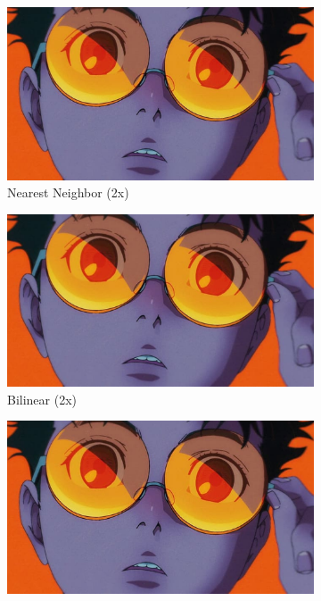 \documentclass[12pt,a4paper]{article}
\begin{document}
\begin{figure}[H]
  \centering
  \begin{subfigure}[b]{0.45\textwidth}
    \includegraphics[width=\textwidth]{interpolation/interpolation_nearest_2x.jpg}
    \caption{Nearest Neighbor (2x)}
  \end{subfigure}
  \hfill
  \begin{subfigure}[b]{0.45\textwidth}
    \includegraphics[width=\textwidth]{interpolation/interpolation_bilinear_2x.jpg}
    \caption{Bilinear (2x)}
  \end{subfigure}
  \vspace{1em}
  \begin{subfigure}[b]{0.45\textwidth}
    \includegraphics[width=\textwidth]{interpolation/interpolation_bicubic_2x.jpg}

\end{subfigure}
\end{figure}
\end{document}
